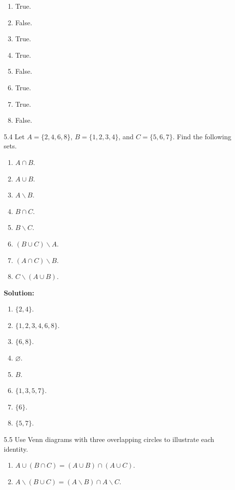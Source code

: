 \begin{enumerate}
      \begin{enumerate}
         \item True.
         \item False.
         \item True.
         \item True.
         \item False.
         \item True.
         \item True.
         \item False.
      \end{enumerate}
   \item[5.4]  Let $A = \{2, 4, 6, 8\}$, $B = \{1, 2, 3, 4\}$, and
               $C = \{5, 6, 7\}$. Find the following sets.
               \begin{enumerate}
                  \item $A \cap B$.
                  \item $A \cup B$.
                  \item $A{\backslash}B$.
                  \item $B \cap C$.
                  \item $B{\backslash}C$.
                  \item $(B \cup C){\backslash}A$.
                  \item $(A \cap C){\backslash}B$.
                  \item $C{\backslash}(A \cup B)$.
               \end{enumerate}
               
      \textbf{Solution:}
      
      \begin{enumerate}
         \item $\{2, 4\}$.
         \item $\{1, 2, 3, 4, 6, 8\}$.
         \item $\{6, 8\}$.
         \item $\varnothing$.
         \item $B$.
         \item $\{1, 3, 5, 7\}$.
         \item $\{6\}$.
         \item $\{5, 7\}$.
      \end{enumerate}
   \item[5.5]  Use Venn diagrams with three overlapping circles to illustrate
               each identity.
               \begin{enumerate}
                  \item $A \cup (B \cap C) = (A \cup B) \cap (A \cup C)$.
                  \item $A{\backslash}(B \cup C) = (A{\backslash}B) \cap
                         A{\backslash}C$.
               \end{enumerate}
               

\end{enumerate}
